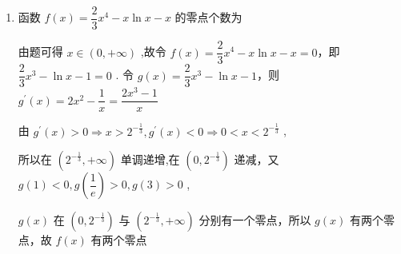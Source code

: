 \begin{enumerate}
\begin{enumerate}
\begin{jieda}
            B. $f\left( x\right)  = \ln x - \dfrac{1}{3}x,{f}^{\prime }\left( x\right)  = \dfrac{1}{x} - \dfrac{1}{3} = 0$ ,得 $x = 3$ ,当 $0 < x < 3$ 时, ${y}^{\prime } > 0$ ,函数单调递增，当 $x > 3$ 时， ${y}^{\prime } < 0$ ，函数单调递减，当 $x = 3$ 时，函数取得最大值 $\ln 3 - 1 > 0$ ，且 $f\left( 1\right)  =  - \dfrac{1}{3} < 0$ ，所以 $x \in  \left( {1,3}\right)$ 只有 1 个零点，$f\left( {{e}}^{2}\right)  = 2 - \dfrac{{{e}}^{2}}{3} < 0$ ，所以在区间 $\left( {3,{{e}}^{2}}\right)$ 只有 1 个零点，所以函数 $y = \ln x - \dfrac{1}{3}x$ 有 2 个零点
            
            C. $y = {{e}}^{x} - \left( {x + 1}\right) ,{y}^{\prime } = {{e}}^{x} - 1 = 0$ ,得 $x = 0$，当 $x < 0$ 时， ${y}^{\prime } < 0$ ，函数单调递减，当 $x > 0$ 时， ${y}^{\prime } > 0$ ，函数单调递增，所以当 $x = 0$ 时，函数取得最小值 0，所以 $y = {{e}}^{x} - \left( {x + 1}\right)$ 只有 1 个零点，
            
            D. $f\left( x\right)  = {2}^{x} + \lg x$ 在定义域 $\left( {0, + \infty }\right)$ 单调递增， $f\left( \dfrac{1}{100}\right)  = {2}^{\frac{1}{100}} - 2 < 0,f\left( 1\right)  = 2 > 0$，所以函数 $y = {2}^{x} + \lg x$ 只有 1 个零点
        \end{jieda}
        
        \item 函数 $f\left( x\right)  = \dfrac{2}{3}{x}^{4} - x\ln x - x$ 的零点个数为
        \begin{jieda}
            由题可得 $x \in  \left( {0, + \infty }\right)$ ,故令 $f\left( x\right)  = \dfrac{2}{3}{x}^{4} - x\ln x - x = 0$，即 $\dfrac{2}{3}{x}^{3} - \ln x - 1 = 0$ . 令 $g\left( x\right)  = \dfrac{2}{3}{x}^{3} - \ln x - 1$，则 ${g}^{\prime }\left( x\right)  = 2{x}^{2} - \dfrac{1}{x} = \dfrac{2{x}^{3} - 1}{x}$
            
            由 ${g}^{\prime }\left( x\right)  > 0 \Longrightarrow  x > {2}^{-\frac{1}{3}},{g}^{\prime }\left( x\right)  < 0 \Longrightarrow  0 < x < {2}^{-\frac{1}{3}}$ ,
            
            所以在 $\left( {{2}^{-\frac{1}{3}}, + \infty }\right)$ 单调递增,在 $\left( {0,{2}^{-\frac{1}{3}}}\right)$ 递减，又 $g\left( 1\right) < 0,g\left( \dfrac{1}{{e}}\right)   > 0,g\left( 3\right) > 0$ ,
            
            $g\left( x\right)$ 在 $\left( {0,{2}^{-\frac{1}{3}}}\right)$ 与 $\left( {{2}^{-\frac{1}{3}}, + \infty }\right)$ 分别有一个零点，所以 $g\left( x\right)$ 有两个零点，故 $f\left( x\right)$ 有两个零点
        \end{jieda}


\end{enumerate}
\end{enumerate}
